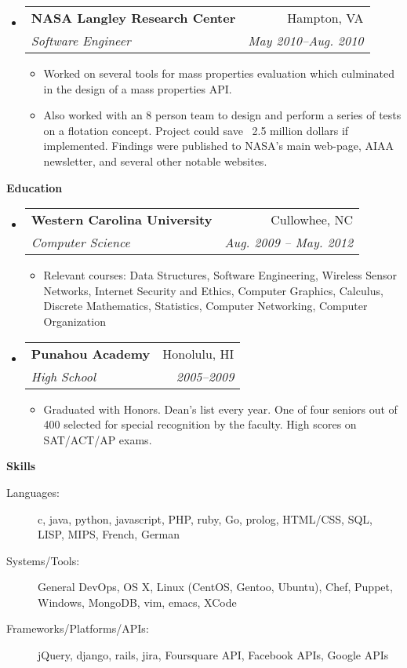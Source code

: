 \documentclass[letterpaper,11pt]{article}
\makeatletter
\newcommand{\resitem}[1]{\item #1 \vspace{-2pt}}
\newcommand{\resheading}[1]{{\large \colorbox{mygrey}{\begin{minipage}{\textwidth}{\textbf{#1 \vphantom{p\^{E}}}}\end{minipage}}}}
\newcommand{\ressubheading}[4]{
\begin{tabular*}{7.0in}{l@{\extracolsep{\fill}}r}
		\textbf{#1} & #2 \\
		\textit{#3} & \textit{#4} \\
\end{tabular*}\vspace{-6pt}}
\makeatother
\begin{document}
\begin{itemize}
\begin{itemize}
   \end{itemize}
\item
   \ressubheading{NASA Langley Research Center}{Hampton, VA}{Software Engineer}{May 2010--Aug. 2010}
      \begin{itemize}
         \resitem{Worked on several tools for mass properties evaluation which culminated in the design of a mass properties API.} 
         \resitem{Also worked with an 8 person team to design and perform a series of tests on a flotation concept. Project could save ~2.5 million dollars if implemented. Findings were published to NASA's main web-page, AIAA newsletter, and several other notable websites.}
      \end{itemize}
\end{itemize}
\resheading{Education}
\begin{itemize}
\item
   \ressubheading{Western Carolina University}{Cullowhee, NC}{Computer Science}{Aug. 2009 -- May. 2012}
   \begin{itemize}
      \resitem{Relevant courses: Data Structures, Software Engineering, Wireless Sensor Networks, Internet Security and Ethics, Computer Graphics, Calculus, Discrete Mathematics, Statistics, Computer Networking, Computer Organization}
   \end{itemize}
\item
   \ressubheading{Punahou Academy}{Honolulu, HI}{High School}{2005--2009}
   \begin{itemize}
      \resitem{Graduated with Honors. Dean's list every year. One of four seniors out of 400 selected for special recognition by the faculty. High scores on SAT/ACT/AP exams.}
   \end{itemize}
\end{itemize}
\pagebreak
\resheading{Skills}
\begin{description}
\item[Languages:]
c, java, python, javascript, PHP, ruby, Go, prolog, HTML/CSS, SQL, LISP, MIPS, French, German
\item[Systems/Tools:]
General DevOps, OS X, Linux (CentOS, Gentoo, Ubuntu), Chef, Puppet, Windows, MongoDB, vim, emacs, XCode
\item[Frameworks/Platforms/APIs:]
jQuery, django, rails, jira, Foursquare API, Facebook APIs, Google APIs
\end{description}
\end{document}
